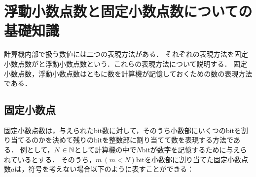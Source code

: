 \chapter{浮動小数点数と固定小数点数についての基礎知識}
\label{chap:基礎知識1}
計算機内部で扱う数値には二つの表現方法がある．
それぞれの表現方法を固定小数点数がと浮動小数点数という．これらの表現方法について説明する．
固定小数点数，浮動小数点数はともに数を計算機が記憶しておくための数の表現方法である．

\section{固定小数点}
固定小数点数は，与えられたbit数に対して，そのうち小数部にいくつのbitを割り当てるのかを決めて残りのbitを整数部に割り当てて数を表現する方法である．
例として，$N \in \mathbb{N}$として計算機の中で$N$bitが数字を記憶するために与えられているとする．
そのうち，$m \ (m < N)$bitを小数部に割り当てた固定小数点数$a$は，符号を考えない場合以下のように表すことができる：

